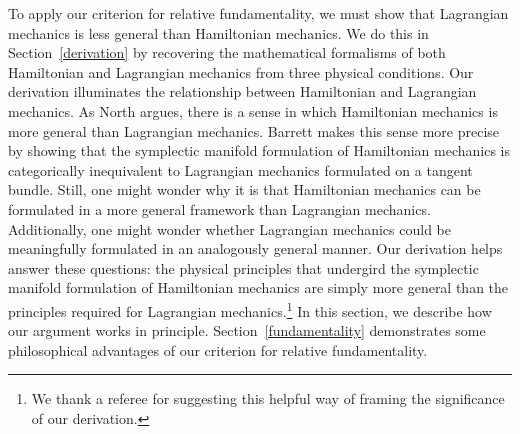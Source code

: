 \documentclass[12pt, twoside]{article}
\begin{document}
To apply our criterion for relative fundamentality, we must show that Lagrangian mechanics is less general than Hamiltonian mechanics. We do this in Section~\ref{derivation} by recovering the mathematical formalisms of both Hamiltonian and Lagrangian mechanics from three physical conditions. Our derivation illuminates the relationship between Hamiltonian and Lagrangian mechanics. As North \parencites*[]{North} argues, there is a sense in which Hamiltonian mechanics is more general than Lagrangian mechanics. Barrett \parencites*[]{Barrett2} makes this sense more precise by showing that the symplectic manifold formulation of Hamiltonian mechanics is categorically inequivalent to Lagrangian mechanics formulated on a tangent bundle. Still, one might wonder why it is that Hamiltonian mechanics can be formulated in a more general framework than Lagrangian mechanics. Additionally, one might wonder whether Lagrangian mechanics could be meaningfully formulated in an analogously general manner. Our derivation helps answer these questions: the physical principles that undergird the symplectic manifold formulation of Hamiltonian mechanics are simply more general than the principles required for Lagrangian mechanics.\footnote{We thank a referee for suggesting this helpful way of framing the significance of our derivation.} In this section, we describe how our argument works in principle. Section~\ref{fundamentality} demonstrates some philosophical advantages of our criterion for relative fundamentality.

\end{document}
